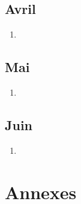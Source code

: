 \documentclass[10pt,a4paper]{book}
\begin{document}
\chapter{Avril}

\begin{enumerate}
    \item 
\end{enumerate}

\chapter{Mai}

\begin{enumerate}
    \item 
\end{enumerate}

\chapter{Juin}

\begin{enumerate}
    \item 
\end{enumerate}

\newpage

\part{Annexes}
\end{document}
